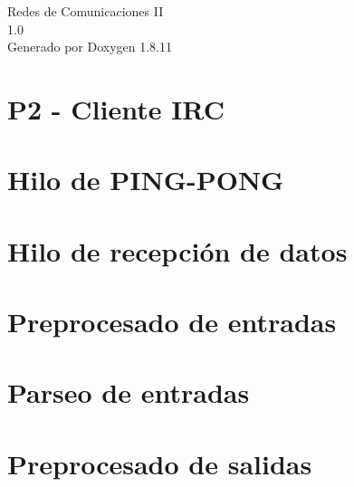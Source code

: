 \documentclass[twoside]{book}
\newcommand{\+}{\discretionary{\mbox{\scriptsize$\hookleftarrow$}}{}{}}
\newcommand{\clearemptydoublepage}{%
  \newpage{\pagestyle{empty}\cleardoublepage}%
}
\begin{document}
\hypersetup{pageanchor=false,
             bookmarksnumbered=true,
             pdfencoding=unicode
            }
\begin{titlepage}
\vspace*{7cm}
\begin{center}%
{\Large Redes de Comunicaciones II \\[1ex]\large 1.\+0 }\\
\vspace*{1cm}
{\large Generado por Doxygen 1.8.11}\\
\end{center}
\end{titlepage}
\clearemptydoublepage
\tableofcontents
\clearemptydoublepage
{}
\hypersetup{pageanchor=true}

\chapter{P2 -\/ Cliente I\+RC}
\label{index}\hypertarget{index}{}
\chapter{Hilo de P\+I\+N\+G-\/\+P\+O\+NG}
\label{client_function_ping}
\hypertarget{client_function_ping}{}

\chapter{Hilo de recepción de datos}
\label{client_function_response}
\hypertarget{client_function_response}{}

\chapter{Preprocesado de entradas}
\label{client_pre_in_function}
\hypertarget{client_pre_in_function}{}

\chapter{Parseo de entradas}
\label{client_execute_in_function}
\hypertarget{client_execute_in_function}{}

\chapter{Preprocesado de salidas}
\label{client_pre_out_function}
\hypertarget{client_pre_out_function}{}

\end{document}
